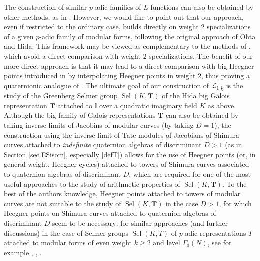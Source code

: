 \documentclass[a4paper,11pt]{amsart}
\numberwithin{equation}{section}
\theoremstyle{plain}
\theoremstyle{definition}
\theoremstyle{remark}
\newcommand{\I}{\mathbb{I}}
\DeclareMathOperator{\Sel}{Sel}
\begin{document}
The construction of similar $p$-adic families of $L$-functions can also be obtained by other methods, as in \cite{JLZ, LRZ, Seveso}. However, we would like to point out that our approach, even if restricted to the ordinary case, builds directly on weight $2$ specializations of a given $p$-adic family of modular forms, following the original approach of Ohta and Hida. This framework may be viewed as complementary to the methods of \cite{JLZ, LRZ, Seveso}, which avoid a direct comparison with weight $2$ specializations. The benefit of our more direct approach is that it may lead to a direct comparison with big Heegner points introduced in \cite{LV-MM} by interpolating Heegner points in weight $2$, thus proving a quaternionic analogue of \cite{Castella-MathAnn, Castella}. 
The ultimate goal of our construction of $\mathscr{L}_{\I,\boldsymbol{\xi}}$
is the study of the Greenberg Selmer group $\Sel(K,\mathbf{T})$ of the
Hida big Galois representation $\mathbf{T}$ attached to $\I$ over a quadratic imaginary field $K$ as above.
Although the big family of Galois representations $\mathbf{T}$ can also be obtained by taking inverse limits of Jacobins of modular curves (by taking $D=1$), the construction using the 
inverse limit of Tate modules of Jacobians of Shimura curves attached to \emph{indefinite} quaternion algebras of discriminant $D>1$ (as in 
Section \ref{sec.ESisom}, especially \eqref{defT}) allows for the use of Heegner points (or, in general weight, Heegner cycles)  attached to towers of Shimura curves associated to quaternion algebras of discriminant $D$, which are required for one of the most useful approaches to the study of arithmetic properties of 
$\Sel(K,\mathbf{T})$. To the best of the authors knowledge, Heegner points attached to towers of modular curves are not suitable to the study of $\Sel(K,\mathbf{T})$ in the case $D>1$, for which Heegner points on Shimura curves attached to quaternion algebras of discriminant $D$ seem to be necessary: 
for similar approaches (and further discussions) in the case of Selmer groups 
$\Sel(K,T)$ of $p$-adic representations $T$ attached to modular forms of even weight $k\geq 2$  and level $\Gamma_0(N)$, see for example \cite{NekCM}, \cite{NekLR}, \cite{Longo-AIF}.
\end{document}
